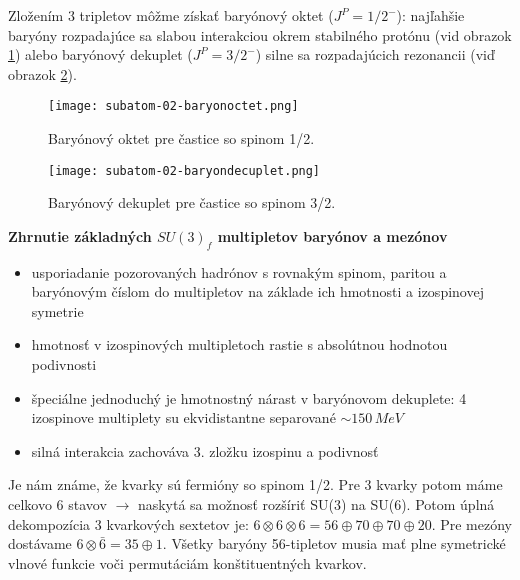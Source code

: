 \documentclass[../../main.tex]{subfiles}
\begin{document}
Zložením 3 tripletov môžme získať baryónový oktet ($J^P=1/2^{-}$): najľahšie baryóny rozpadajúce sa slabou interakciou okrem stabilného protónu (vid obrazok \ref{sf2:fig:baryonoctet}) alebo baryónový dekuplet ($J^P=3/2^{-}$) silne sa rozpadajúcich rezonancii (viď obrazok \ref{sf2:fig:baryondecuplet}). 

\begin{figure}[!h]
\texttt{[image: subatom-02-baryonoctet.png]}
\centering
\caption{Baryónový oktet pre častice so spinom 1/2.}
\label{sf2:fig:baryonoctet}
\end{figure}

\begin{figure}[!h]
\texttt{[image: subatom-02-baryondecuplet.png]}
\centering
\caption{Baryónový dekuplet pre častice so spinom 3/2.}
\label{sf2:fig:baryondecuplet}
\end{figure}

\textbf{Zhrnutie základných $SU(3)_f$ multipletov baryónov a mezónov}
\begin{itemize}
\item usporiadanie pozorovaných hadrónov s rovnakým spinom, paritou a baryónovým číslom do multipletov na základe ich hmotnosti a izospinovej symetrie
\item hmotnosť v izospinových multipletoch rastie s absolútnou hodnotou podivnosti
\item špeciálne jednoduchý je hmotnostný nárast v baryónovom dekuplete: 4 izospinove multiplety su ekvidistantne separované $\sim 150\,MeV$ 
\item silná interakcia zachováva 3. zložku izospinu a podivnosť 
\end{itemize}

Je nám známe, že kvarky sú fermióny so spinom 1/2. Pre 3 kvarky potom máme celkovo 6 stavov $\rightarrow$ naskytá sa možnosť rozšíriť SU(3) na SU(6). Potom úplná dekompozícia 3 kvarkových sextetov je:
$6 \otimes 6 \otimes 6 = 56 \oplus 70 \oplus 70 \oplus 20 $. Pre mezóny dostávame $6 \otimes \bar{6} = 35 \oplus 1$. Všetky baryóny 56-tipletov musia mať plne symetrické vlnové funkcie voči permutáciám konštituentných kvarkov.\newline
\end{document}
